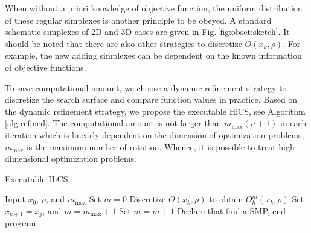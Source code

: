 \documentclass[final,1p,times]{elsarticle}
\begin{document}
When without a priori knowledge of objective function, the
uniform distribution of these regular simplexes is another
principle to be obeyed.
A standard schematic simplexes of 2D and
3D cases are given in Fig.\,\ref{fig:obset:sketch}.
It should be noted that there are also other strategies to
discretize $O(x_k,\rho)$. 
For example, the new adding simplexes can be
dependent on the known information of objective functions. 

To save computational amount, we choose a dynamic refinement
strategy to discretize the search surface and compare function
values in practice. 
Based on the dynamic refinement strategy, we propose the
executable HiCS, see Algorithm \ref{alg:refined}. The computational amount is not
larger than $m_{\max}(n+1)$ in each iteration which is linearly
dependent on the dimension of optimization problems,
$m_{\max}$ is the maximum number of rotation.
Whence, it is possible to treat high-dimensional optimization problems.

\begin{algorithm}[H]
	\caption{Executable HiCS}
	\label{alg:refined}
\begin{algorithmic}[1]
	\STATE Input $x_0$, $\rho$, and $m_{\max}$
		\STATE Set $m=0$
			\STATE Discretize $O(x_k,\rho)$ to obtain $O^m_h(x_k,\rho)$
				\STATE Set $x_{k+1}=x_j$, and $m=m_{\max}+1$
			\ELSE
				\STATE Set $m = m+1$
			\ENDIF
		\ELSE
			\STATE Declare that find a SMP, end program
		\ENDIF
	\ENDFOR
\end{algorithmic}
\end{algorithm}

\end{document}
